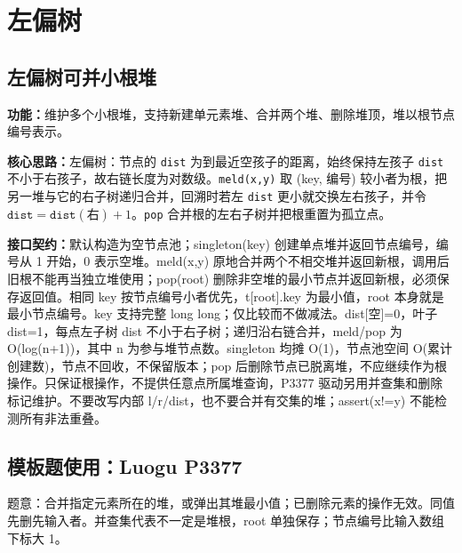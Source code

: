 \section{左偏树}

\subsection{左偏树可并小根堆}\label{compact-LeftistHeap}

\noindent\textbf{功能：}\allowbreak 维护多个小根堆，支持新建单元素堆、合并两个堆、删除堆顶，堆以根节点编号表示。

\textbf{核心思路：}\allowbreak 左偏树：节点的 \texttt{dist} 为到最近空孩子的距离，始终保持左孩子 \texttt{dist} 不小于右孩子，故右链长度为对数级。\texttt{meld(x,y)} 取 (key, 编号) 较小者为根，把另一堆与它的右子树递归合并，回溯时若左 \texttt{dist} 更小就交换左右孩子，并令 $\texttt{dist}=\texttt{dist}(\text{右})+1$。\texttt{pop} 合并根的左右子树并把根重置为孤立点。



{\sloppy{}\noindent\textbf{接口契约：}默认构造为空节点池；singleton(key) 创建单点堆并返回节点编号，编号从 1 开始，0 表示空堆。meld(x,y) 原地合并两个不相交堆并返回新根，调用后旧根不能再当独立堆使用；pop(root) 删除非空堆的最小节点并返回新根，必须保存返回值。相同 key 按节点编号小者优先，t[root].key 为最小值，root 本身就是最小节点编号。key 支持完整 long long；仅比较而不做减法。dist[空]=0，叶子 dist=1，每点左子树 dist 不小于右子树；递归沿右链合并，meld/pop 为 O(log(n+1))，其中 n 为参与堆节点数。singleton 均摊 O(1)，节点池空间 O(累计创建数)，节点不回收，不保留版本；pop 后删除节点已脱离堆，不应继续作为根操作。只保证根操作，不提供任意点所属堆查询，P3377 驱动另用并查集和删除标记维护。不要改写内部 l/r/dist，也不要合并有交集的堆；assert(x!=y) 不能检测所有非法重叠。\par}



\Needspace{639pt}

\subsection*{模板题使用：Luogu P3377}

\label{usage-example-50}

题意：合并指定元素所在的堆，或弹出其堆最小值；已删除元素的操作无效。同值先删先输入者。并查集代表不一定是堆根，root 单独保存；节点编号比输入数组下标大 1。

